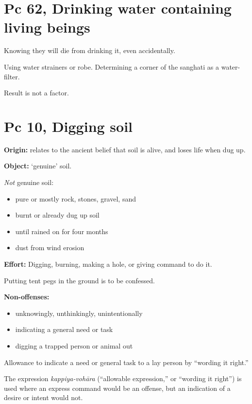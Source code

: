 \section{Pc 62, Drinking water containing living beings}

Knowing they will die from drinking it, even accidentally.

Using water strainers or robe. Determining a corner of the sanghati as a
water-filter.

Result is not a factor.

\section{Pc 10, Digging soil}

\begin{multicols}{2}

\textbf{Origin:} relates to the ancient belief that soil is alive, and
loses life when dug up.

\textbf{Object:} `genuine' soil.

\emph{Not} genuine soil:

\begin{itemize}
\tightlist
\item
  pure or mostly rock, stones, gravel, sand
\item
  burnt or already dug up soil
\item
  until rained on for four months
\item
  dust from wind erosion
\end{itemize}

\textbf{Effort:} Digging, burning, making a hole, or giving command to
do it.

Putting tent pegs in the ground is to be confessed.

\columnbreak

\textbf{Non-offenses:}

\begin{itemize}
\tightlist
\item
  unknowingly, unthinkingly, unintentionally
\item
  indicating a general need or task
\item
  digging a trapped person or animal out
\end{itemize}

Allowance to indicate a need or general task to a lay person by
``wording it right.''

The expression \emph{kappiya-vohāra} (``allowable expression,'' or
``wording it right'') is used where an express command would be an
offense, but an indication of a desire or intent would not.

\end{multicols}

